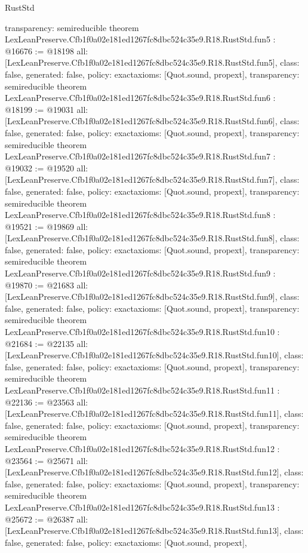 \begin{lexlean}{RustStd}
\begin{coremodule}
{  transparency: semireducible
}
theorem LexLeanPreserve.Cfb1f0a02e181ed1267fc8dbc524c35e9.R18.RustStd.fun5 : @16676 := @18198 {
  all: [LexLeanPreserve.Cfb1f0a02e181ed1267fc8dbc524c35e9.R18.RustStd.fun5],
  class: false,
  generated: false,
  policy: exact{axioms: [Quot.sound, propext]},
  transparency: semireducible
}
theorem LexLeanPreserve.Cfb1f0a02e181ed1267fc8dbc524c35e9.R18.RustStd.fun6 : @18199 := @19031 {
  all: [LexLeanPreserve.Cfb1f0a02e181ed1267fc8dbc524c35e9.R18.RustStd.fun6],
  class: false,
  generated: false,
  policy: exact{axioms: [Quot.sound, propext]},
  transparency: semireducible
}
theorem LexLeanPreserve.Cfb1f0a02e181ed1267fc8dbc524c35e9.R18.RustStd.fun7 : @19032 := @19520 {
  all: [LexLeanPreserve.Cfb1f0a02e181ed1267fc8dbc524c35e9.R18.RustStd.fun7],
  class: false,
  generated: false,
  policy: exact{axioms: [Quot.sound, propext]},
  transparency: semireducible
}
theorem LexLeanPreserve.Cfb1f0a02e181ed1267fc8dbc524c35e9.R18.RustStd.fun8 : @19521 := @19869 {
  all: [LexLeanPreserve.Cfb1f0a02e181ed1267fc8dbc524c35e9.R18.RustStd.fun8],
  class: false,
  generated: false,
  policy: exact{axioms: [Quot.sound, propext]},
  transparency: semireducible
}
theorem LexLeanPreserve.Cfb1f0a02e181ed1267fc8dbc524c35e9.R18.RustStd.fun9 : @19870 := @21683 {
  all: [LexLeanPreserve.Cfb1f0a02e181ed1267fc8dbc524c35e9.R18.RustStd.fun9],
  class: false,
  generated: false,
  policy: exact{axioms: [Quot.sound, propext]},
  transparency: semireducible
}
theorem LexLeanPreserve.Cfb1f0a02e181ed1267fc8dbc524c35e9.R18.RustStd.fun10 : @21684 := @22135 {
  all: [LexLeanPreserve.Cfb1f0a02e181ed1267fc8dbc524c35e9.R18.RustStd.fun10],
  class: false,
  generated: false,
  policy: exact{axioms: [Quot.sound, propext]},
  transparency: semireducible
}
theorem LexLeanPreserve.Cfb1f0a02e181ed1267fc8dbc524c35e9.R18.RustStd.fun11 : @22136 := @23563 {
  all: [LexLeanPreserve.Cfb1f0a02e181ed1267fc8dbc524c35e9.R18.RustStd.fun11],
  class: false,
  generated: false,
  policy: exact{axioms: [Quot.sound, propext]},
  transparency: semireducible
}
theorem LexLeanPreserve.Cfb1f0a02e181ed1267fc8dbc524c35e9.R18.RustStd.fun12 : @23564 := @25671 {
  all: [LexLeanPreserve.Cfb1f0a02e181ed1267fc8dbc524c35e9.R18.RustStd.fun12],
  class: false,
  generated: false,
  policy: exact{axioms: [Quot.sound, propext]},
  transparency: semireducible
}
theorem LexLeanPreserve.Cfb1f0a02e181ed1267fc8dbc524c35e9.R18.RustStd.fun13 : @25672 := @26387 {
  all: [LexLeanPreserve.Cfb1f0a02e181ed1267fc8dbc524c35e9.R18.RustStd.fun13],
  class: false,
  generated: false,
  policy: exact{axioms: [Quot.sound, propext]},
}
\end{coremodule}
\end{lexlean}
